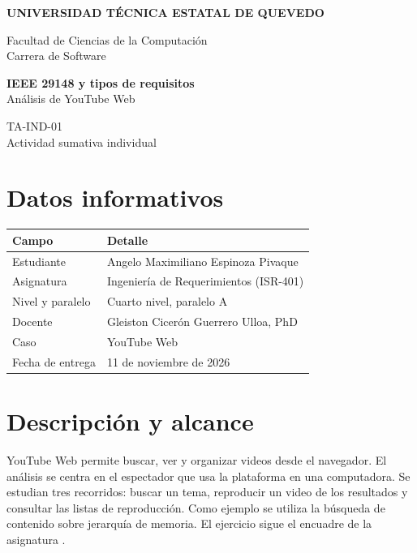 \documentclass[11pt,a4paper]{article}
\begin{document}
\begin{center}
    {\large\textbf{UNIVERSIDAD TÉCNICA ESTATAL DE QUEVEDO}}

    Facultad de Ciencias de la Computación\\
    Carrera de Software

    \vspace{0.6cm}
    {\LARGE\textbf{IEEE 29148 y tipos de requisitos}}\\[4pt]
    {\large Análisis de YouTube Web}

    \vspace{0.2cm}
    {\large TA-IND-01}\\
    Actividad sumativa individual
\end{center}

\vspace{0.4cm}
\section{Datos informativos}
\begin{tabularx}{\textwidth}{|l|X|}
\hline
\rowcolor{gray!15}
\textbf{Campo} & \textbf{Detalle} \\ \hline
Estudiante & Angelo Maximiliano Espinoza Pivaque \\ \hline
Asignatura & Ingeniería de Requerimientos (ISR-401) \\ \hline
Nivel y paralelo & Cuarto nivel, paralelo A \\ \hline
Docente & Gleiston Cicerón Guerrero Ulloa, PhD \\ \hline
Caso & YouTube Web \\ \hline
Fecha de entrega & 11 de noviembre de 2026 \\ \hline
\end{tabularx}

\section{Descripción y alcance}
YouTube Web permite buscar, ver y organizar videos desde el navegador.
El análisis se centra en el espectador que usa la plataforma en una
computadora. Se estudian tres recorridos: buscar un tema, reproducir
un video de los resultados y consultar las listas de reproducción.
Como ejemplo se utiliza la búsqueda de contenido sobre jerarquía de memoria.
El ejercicio sigue el encuadre de la asignatura \cite{uteqencuadre}.
\end{document}
